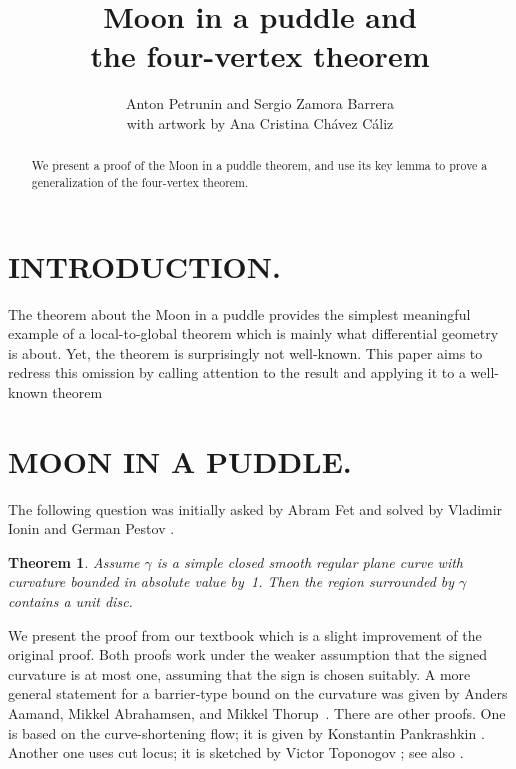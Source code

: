 \documentclass{article}
\theoremstyle{theorem}
\newtheorem{theorem}{Theorem}
\theoremstyle{definition}
\begin{document}
\final
\title{Moon in a puddle and\\ the four-vertex theorem}
\author{Anton Petrunin and Sergio Zamora Barrera\\ with artwork by Ana Cristina Chávez Cáliz}

\maketitle
\BgThispage
\thispagestyle{empty}
\begin{abstract}
We present a proof of the Moon in a puddle theorem, and use its key lemma to prove a generalization of the four-vertex theorem.
\end{abstract}

\newpage

\section*{INTRODUCTION.}

The theorem about the Moon in a puddle provides the simplest meaningful example of a local-to-global theorem which is mainly what differential geometry is about.
Yet, the theorem is surprisingly not well-known.
This paper aims to redress this omission by calling attention to the result and applying it to a well-known theorem

\section*{MOON IN A PUDDLE.}
The following question was initially asked by Abram Fet and solved by Vladimir Ionin and German Pestov \cite{pestov-ionin}.

\begin{theorem}\label{thm:moon-orginal}
Assume $\gamma$ is a simple closed smooth regular plane curve with curvature bounded in absolute value by~1.
Then the region surrounded by $\gamma$ contains a unit disc.
\end{theorem}

We present the proof from our textbook \cite{petrunin-zamora} which is 
a slight improvement of the original proof.
Both proofs work under the weaker assumption that the signed curvature is at most one, assuming that the sign is chosen suitably.
A more general statement for a barrier-type bound on the curvature was given by Anders Aamand, Mikkel Abrahamsen, and Mikkel Thorup~\cite{aamand-abrahamsen-thoru}.
There are other proofs. 
One is based on the curve-shortening flow; it is given by Konstantin Pankrashkin  \cite{pankrashkin}.
Another one uses cut locus; it is sketched by Victor Toponogov 
\cite[Problem 1.7.19]{toponogov}; see also \cite{petrunin-2020,panov-petrunin}.
\end{document}
